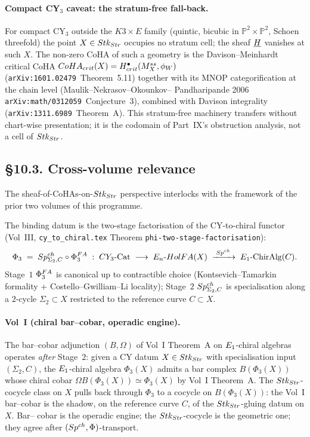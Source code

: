 \paragraph{Compact CY$_{3}$ caveat: the stratum-free fall-back.} For
compact CY$_{3}$ outside the $K3\times E$ family (quintic, bicubic in
$\mathbb{P}^{2}\times\mathbb{P}^{2}$, Schoen threefold) the point
$X\in Stk_{Str}$ occupies no stratum cell; the sheaf
$\underline{H}$ vanishes at such $X$. The non-zero CoHA of such a
geometry is the Davison--Meinhardt critical CoHA
$CoHA_{crit}(X)=H^{\bullet}_{crit}(M^{ss}_{X},
\phi_{W})$ (\texttt{arXiv:1601.02479}~Theorem~5.11) together with its
MNOP categorification at the chain level (Maulik--Nekrasov--Okounkov--
Pandharipande 2006 \texttt{arXiv:math/0312059}~Conjecture~3), combined
with Davison integrality (\texttt{arXiv:1311.6989}~Theorem~A). This
stratum-free machinery transfers without chart-wise presentation; it
is the codomain of Part~IX's obstruction analysis, not a cell of
$Stk_{Str}$.

\subsection*{\S 10.3. Cross-volume relevance}
\label{gluing:sec:10-3-cross-volume}

The sheaf-of-CoHAs-on-$Stk_{Str}$ perspective interlocks with the
framework of the prior two volumes of this programme.

The binding datum is the two-stage factorisation of the
CY-to-chiral functor (Vol~III, \texttt{cy\_to\_chiral.tex} Theorem
\texttt{phi-two-stage-factorisation}):
\[
\Phi_{3}
\;=\;
Sp^{ch}_{\Sigma_{2},C}\circ\Phi^{FA}_{3}
\;:\;
CY_{3}\text{-Cat}\;\longrightarrow\;E_n\text{-}HolFA(X)\;\xrightarrow{\;Sp^{ch}\;}\;E_{1}\text{-ChirAlg}(C).
\]
Stage~$1$ $\Phi^{FA}_{3}$ is canonical up to contractible choice
(Kontsevich--Tamarkin formality + Costello--Gwilliam--Li locality);
Stage~$2$ $Sp^{ch}_{\Sigma_{2},C}$ is specialisation along a $2$-cycle
$\Sigma_{2}\subset X$ restricted to the reference curve $C\subset X$.

\paragraph{Vol~I (chiral bar--cobar, operadic engine).} The
bar--cobar adjunction $(B,\Omega)$ of Vol~I Theorem~A on
$E_{1}$-chiral algebras operates \emph{after} Stage~$2$: given a CY
datum $X\in Stk_{Str}$ with specialisation input $(\Sigma_{2},C)$,
the $E_{1}$-chiral algebra $\Phi_{3}(X)$ admits a bar complex
$B(\Phi_{3}(X))$ whose chiral cobar $\Omega B(\Phi_{3}(X))\simeq
\Phi_{3}(X)$ by Vol~I Theorem~A. The $Stk_{Str}$-cocycle class on
$X$ pulls back through $\Phi_{3}$ to a cocycle on
$B(\Phi_{3}(X))$: the Vol~I bar--cobar is the shadow, on the
reference curve $C$, of the $Stk_{Str}$-gluing datum on $X$. Bar--
cobar is the operadic engine; the $Stk_{Str}$-cocycle is the
geometric one; they agree after $(Sp^{ch},\Phi)$-transport.

